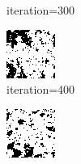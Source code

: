 \documentclass{article}
\begin{document}
\begin{figure}[h]
\begin{subfigure}[t]{0.18\textwidth}
\vspace{-0.6cm}
\caption{iteration=300}
\end{subfigure}\hspace{0.01\textwidth}
\begin{subfigure}[t]{0.18\textwidth}
\centering
\includegraphics[width=\textwidth]{./computational/results/gibbs_comb_sampler_positive_iter_400.png}
\vspace{-0.6cm}
\caption{iteration=400}
\end{subfigure}\hspace{0.01\textwidth}
\begin{subfigure}[t]{0.18\textwidth}
\centering
\includegraphics[width=\textwidth]{./computational/results/gibbs_comb_sampler_positive_iter_500.png}

\end{subfigure}
\end{figure}
\end{document}
